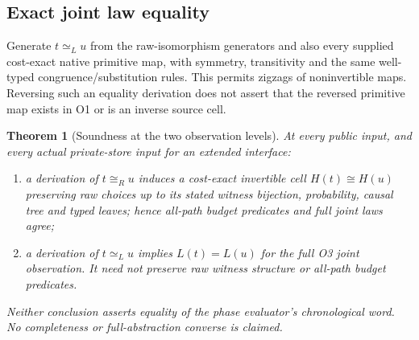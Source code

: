 \documentclass[11pt,a4paper]{article}
\newtheorem{theorem}{Theorem}[section]
\theoremstyle{definition}
\begin{document}
\subsection{Exact joint law equality}
Generate $t\simeq_L u$ from the raw-isomorphism generators and also every
supplied cost-exact native primitive map, with symmetry, transitivity and
the same well-typed congruence/substitution rules. This permits zigzags of
noninvertible maps. Reversing such an equality derivation does not assert
that the reversed primitive map exists in O1 or is an inverse source cell.

\begin{theorem}[Soundness at the two observation levels]\label{thm:soundness}
At every public input, and every actual private-store input for an
extended interface:
\begin{enumerate}[label=\textup{(\roman*)}]
\item a derivation of $t\cong_R u$ induces a cost-exact invertible cell
$H(t)\cong H(u)$ preserving raw choices up to its stated witness
bijection, probability, causal tree and typed leaves; hence all-path
budget predicates and full joint laws agree;
\item a derivation of $t\simeq_L u$ implies $L(t)=L(u)$ for the full
O3 joint observation. It need not preserve raw witness structure or
all-path budget predicates.
\end{enumerate}
Neither conclusion asserts equality of the phase evaluator's chronological
word. No completeness or full-abstraction converse is claimed.
\end{theorem}
\end{document}
